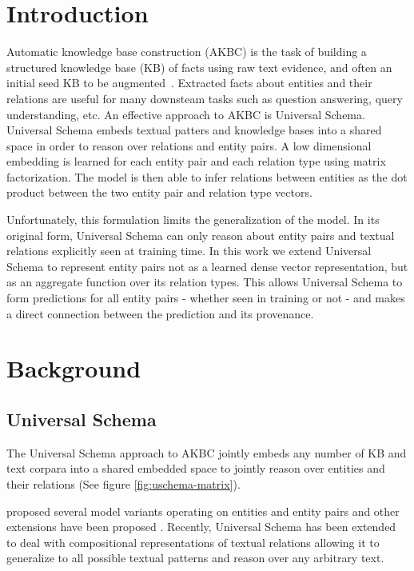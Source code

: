 
\section{Introduction\label{introduction}}

Automatic knowledge base construction (AKBC) is the task of building a structured knowledge base (KB) of facts using raw text evidence, and often an initial seed KB to be augmented~\citep{NELL,yago,freebase}.
Extracted facts about entities and their relations are useful for many downsteam tasks such as question answering, query understanding, etc.
An effective approach to AKBC is Universal Schema.
Universal Schema embeds textual patters and knowledge bases into a shared space in order to reason over relations and entity pairs.
A low dimensional embedding is learned for each entity pair and each relation type using matrix factorization.
The model is then able to infer relations between entities as the dot product between the two entity pair and relation type vectors.

Unfortunately, this formulation limits the generalization of the model.
In its original form, Universal Schema can only reason about entity pairs and textual relations explicitly seen at training time.
In this work we extend Universal Schema to represent entity pairs not as a learned dense vector representation, but as an aggregate function over its relation types.
This allows Universal Schema to form predictions for all entity pairs - whether seen in training or not - and makes a direct connection between the prediction and its provenance.



\section {Background}

\subsection {Universal Schema}
The Universal Schema \citep{limin} approach to AKBC jointly embeds any number of KB and text corpara into a shared embedded space to jointly reason over entities and their relations (See figure \ref {fig:uschema-matrix}).

\citet{limin} proposed several model variants operating on entities and entity pairs and other extensions have been proposed \citep{yao2013universal,vector_pra,neelakantan2015compositional,logicmfnaacl15}. Recently, Universal Schema has been extended to deal with compositional representations of textual relations \citep{toutanova2015representing,verga2015multilingual} allowing it to generalize to all possible textual patterns and reason over any arbitrary text.

